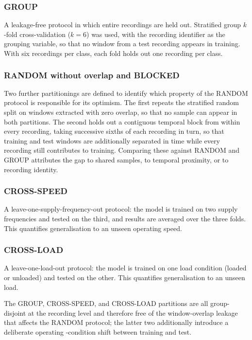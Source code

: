 \subsubsection{GROUP}
A leakage-free protocol in which entire recordings are held out. Stratified
group $k$-fold cross-validation ($k=6$) was used, with the recording identifier as
the grouping variable, so that no window from a test recording appears in
training. With six recordings per class, each fold holds out one recording per
class.

\subsubsection{RANDOM without overlap and BLOCKED}
Two further partitionings are defined to identify which property of the RANDOM
protocol is responsible for its optimism. The first repeats the stratified random
split on windows extracted with zero overlap, so that no sample can appear in both
partitions. The second holds out a contiguous temporal block from within every
recording, taking successive sixths of each recording in turn, so that training
and test windows are additionally separated in time while every recording still
contributes to training. Comparing these against RANDOM and GROUP attributes the
gap to shared samples, to temporal proximity, or to recording identity.

\subsubsection{CROSS-SPEED}
A leave-one-supply-frequency-out protocol: the model is trained on two supply
frequencies and tested on the third, and results are averaged over the three
folds. This quantifies generalisation to an unseen operating speed.

\subsubsection{CROSS-LOAD}
A leave-one-load-out protocol: the model is trained on one load condition
(loaded or unloaded) and tested on the other. This quantifies generalisation to
an unseen load.

The GROUP, CROSS-SPEED, and CROSS-LOAD partitions are all group-disjoint at the
recording level and therefore free of the window-overlap leakage that affects the
RANDOM protocol; the latter two additionally introduce a deliberate operating
-condition shift between training and test.

